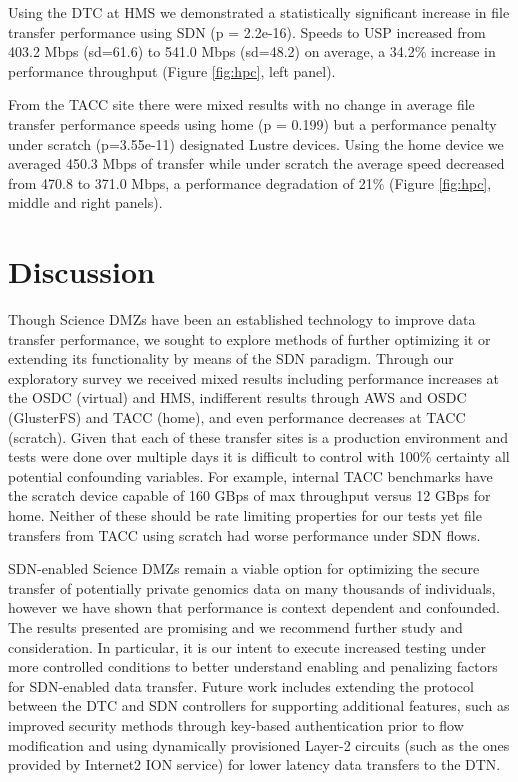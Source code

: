 \documentclass{sig-alternate-05-2015}
\begin{document}
Using the DTC at HMS we demonstrated a statistically significant increase in file transfer performance using SDN (p = 2.2e-16). Speeds to USP increased from 403.2 Mbps (sd=61.6) to 541.0 Mbps (sd=48.2) on average, a 34.2\% increase in performance throughput  (Figure \ref{fig:hpc}, left panel). 

From the TACC site there were mixed results with no change in average file transfer performance speeds using home (p = 0.199) but a performance penalty under scratch (p=3.55e-11) designated Lustre devices. Using the home device we averaged 450.3 Mbps of transfer while under scratch the average speed decreased from 470.8 to 371.0 Mbps, a performance degradation of 21\% (Figure \ref{fig:hpc}, middle and right panels).

\section{Discussion}

Though Science DMZs have been an established technology to improve data transfer performance, we sought to explore methods of further optimizing it or extending its functionality by means of the SDN paradigm. Through our exploratory survey we received mixed results including performance increases at the OSDC (virtual) and HMS, indifferent results through AWS and OSDC (GlusterFS) and TACC (home), and even performance decreases at TACC (scratch). Given that each of these transfer sites is a production environment and tests were done over multiple days it is difficult to control with 100\% certainty all potential confounding variables. For example, internal TACC benchmarks have the scratch device capable of 160 GBps of max throughput versus 12 GBps for home. Neither of these should be rate limiting properties for our tests yet file transfers from TACC using scratch had worse performance under SDN flows.

SDN-enabled Science DMZs remain a viable option for optimizing the secure transfer of potentially private genomics data on many thousands of individuals, however we have shown that performance is context dependent and confounded. The results presented are promising and we recommend further study and consideration. In particular, it is our intent to execute increased testing under more controlled conditions to better understand enabling and penalizing factors for SDN-enabled data transfer. Future work includes extending the protocol between the DTC and SDN controllers for supporting additional features, such as improved security methods through key-based authentication prior to flow modification and using dynamically provisioned Layer-2 circuits (such as the ones provided by Internet2 ION service) for lower latency data transfers to the DTN.   
\end{document}
